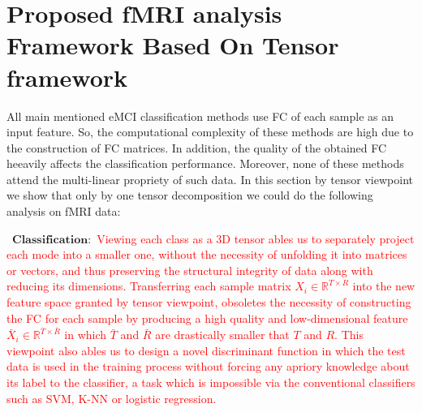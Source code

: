 \documentclass[journal]{IEEEtran}
\begin{document}
	
	\section{Proposed fMRI analysis Framework Based On Tensor framework}
	All main mentioned eMCI classification methods use FC of each sample as an input feature. So, the computational complexity of these methods are high due to the construction of FC matrices. In addition, the quality of the obtained FC heeavily affects the  classification performance. Moreover, none of these methods  attend  the multi-linear propriety of such data.
	In this section by tensor viewpoint we show that only by one tensor decomposition we could do the following analysis on fMRI data:

\textbullet\ $\mathbf{Classification:}$
\textcolor{red}{
	Viewing each class as a 3D tensor ables us to separately project each mode into a smaller one, without the necessity of unfolding it into matrices or vectors, and thus preserving the structural integrity of data along with reducing its dimensions. Transferring each sample matrix $X_i\in \mathbb{R}^{T \times R}$ into the new feature space granted by tensor viewpoint, obsoletes the necessity of constructing the FC for each sample by producing a high quality and low-dimensional feature $\bar{X}_i \in \mathbb{R}^{\bar{T} \times \bar{R}}$ in which $\bar{T}$ and $\bar{R}$ are drastically smaller that $T$ and $R$. This viewpoint also ables us to design a novel discriminant function in which the test data is used in the training process without forcing any apriory knowledge about its label to the classifier, a task which is impossible via the conventional classifiers such as SVM, K-NN or logistic regression.  
}


	 
%	
\end{document}
